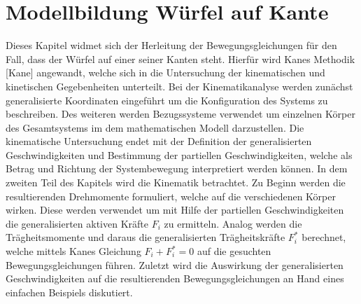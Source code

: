 \ifx\FORMAT\undefined


\fi

\chapter{Modellbildung Würfel auf Kante}
Dieses Kapitel widmet sich der Herleitung der Bewegungsgleichungen für den Fall, dass der Würfel auf einer seiner Kanten steht. Hierfür wird Kanes Methodik [Kane] angewandt, welche sich in die Untersuchung der kinematischen und kinetischen Gegebenheiten unterteilt. Bei der Kinematikanalyse werden zunächst generalisierte Koordinaten eingeführt um die Konfiguration des Systems zu beschreiben. Des weiteren werden Bezugssysteme verwendet um einzelnen Körper des Gesamtsystems im dem mathematischen Modell darzustellen. Die kinematische Untersuchung endet mit der Definition der generalisierten Geschwindigkeiten und Bestimmung der partiellen Geschwindigkeiten, welche als Betrag und Richtung der Systembewegung interpretiert werden können.
In dem zweiten Teil des Kapitels wird die Kinematik betrachtet. Zu Beginn werden die resultierenden Drehmomente formuliert, welche auf die verschiedenen Körper wirken. Diese werden verwendet um mit Hilfe der partiellen Geschwindigkeiten die generalisierten aktiven Kräfte $F_i$ zu ermitteln. Analog werden die Trägheitsmomente und daraus die generalisierten Trägheitskräfte $F^*_i$ berechnet, welche mittels Kanes Gleichung $F_i+F^*_i=0$ auf die gesuchten Bewegungsgleichungen führen. Zuletzt wird die Auswirkung der generalisierten Geschwindigkeiten auf die resultierenden Bewegungsgleichungen an Hand eines einfachen Beispiels diskutiert.
\newpage

\newpage


\ifx\FORMAT\undefined

\fi